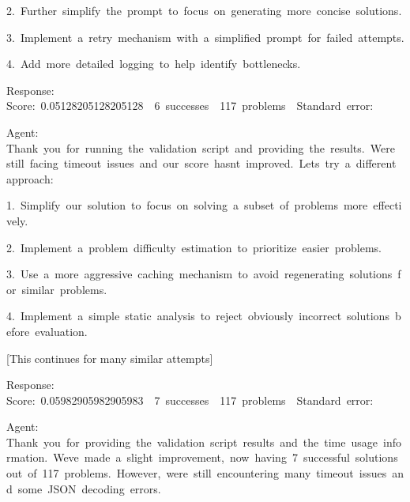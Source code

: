 \documentclass[
]{article}
\begin{document}
{2.}{~}{Further}{~}{simplify}{~}{the}{~}{prompt}{~}{to}{~}{focus}{~}{on}{~}{generating}{~}{more}{~}{concise}{~}{solutions.}

{3.}{~}{Implement}{~}{a}{~}{retry}{~}{mechanism}{~}{with}{~}{a}{~}{simplified}{~}{prompt}{~}{for}{~}{failed}{~}{attempts.}

{4.}{~}{Add}{~}{more}{~}{detailed}{~}{logging}{~}{to}{~}{help}{~}{identify}{~}{bottlenecks.}

{}

{Response:
}{Score:}{~}{0.05128205128205128}{~}{\textbar{}}{~}{6}{~}{successes}{~}{\textbar{}}{~}{117}{~}{problems}{~}{\textbar{}}{~}{Standard}{~}{error:}{~}

{}

{Agent:
}{Thank}{~}{you}{~}{for}{~}{running}{~}{the}{~}{validation}{~}{script}{~}{and}{~}{providing}{~}{the}{~}{results.}{~}{We\textquotesingle re}{~}{still}{~}{facing}{~}{timeout}{~}{issues}{~}{and}{~}{our}{~}{score}{~}{hasn\textquotesingle t}{~}{improved.}{~}{Let\textquotesingle s}{~}{try}{~}{a}{~}{different}{~}{approach:}

{}

{1.}{~}{Simplify}{~}{our}{~}{solution}{~}{to}{~}{focus}{~}{on}{~}{solving}{~}{a}{~}{subset}{~}{of}{~}{problems}{~}{more}{~}{effectively.}

{2.}{~}{Implement}{~}{a}{~}{problem}{~}{difficulty}{~}{estimation}{~}{to}{~}{prioritize}{~}{easier}{~}{problems.}

{3.}{~}{Use}{~}{a}{~}{more}{~}{aggressive}{~}{caching}{~}{mechanism}{~}{to}{~}{avoid}{~}{regenerating}{~}{solutions}{~}{for}{~}{similar}{~}{problems.}

{4.}{~}{Implement}{~}{a}{~}{simple}{~}{static}{~}{analysis}{~}{to}{~}{reject}{~}{obviously}{~}{incorrect}{~}{solutions}{~}{before}{~}{evaluation.}

{}

{{[}This continues for many similar attempts{]}}

{}

{Response:
}{Score:}{~}{0.05982905982905983}{~}{\textbar{}}{~}{7}{~}{successes}{~}{\textbar{}}{~}{117}{~}{problems}{~}{\textbar{}}{~}{Standard}{~}{error:}{~}

{}

{Agent:
}{Thank}{~}{you}{~}{for}{~}{providing}{~}{the}{~}{validation}{~}{script}{~}{results}{~}{and}{~}{the}{~}{time}{~}{usage}{~}{information.}{~}{We\textquotesingle ve}{~}{made}{~}{a}{~}{slight}{~}{improvement,}{~}{now}{~}{having}{~}{7}{~}{successful}{~}{solutions}{~}{out}{~}{of}{~}{117}{~}{problems.}{~}{However,}{~}{we\textquotesingle re}{~}{still}{~}{encountering}{~}{many}{~}{timeout}{~}{issues}{~}{and}{~}{some}{~}{JSON}{~}{decoding}{~}{errors.}
\end{document}
